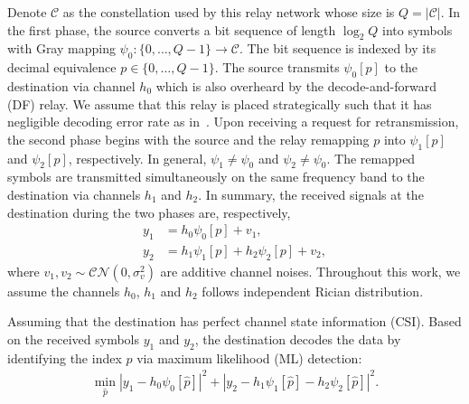\documentclass[journal]{IEEEtran}
\begin{document}
Denote $\mathcal{C}$ as the constellation used by this relay network whose size
is $Q = |\mathcal{C}|$. In the first phase, the source converts a bit sequence
of length $\log_2Q$ into symbols with Gray mapping $\psi_0: \{0,\ldots,Q -
1\}\rightarrow \mathcal{C}$. The bit sequence is indexed by its decimal
equivalence $p\in \{0,\ldots,Q - 1\}$. The source transmits $\psi_0[p]$ to the
destination via channel $h_0$ which is also overheard by the decode-and-forward
(DF) relay. We assume that this relay is placed strategically such that it has
negligible decoding error rate as in~\cite{ryu2011ber, kim2009design}. Upon
receiving a request for retransmission, the second phase begins with
the source and the relay remapping $p$ into $\psi_1[p]$ and $\psi_2[p]$,
respectively.  In general,  $\psi_1\not=\psi_0$ and $\psi_2\not=\psi_0$. The
remapped symbols are transmitted simultaneously on the same frequency band to the
destination via channels $h_1$ and $h_2$. In summary, the received signals at the
destination during the two phases are, respectively, 
\begin{subequations}
    \begin{align}
       y_1 & = h_0\psi_0[p] + v_1, \\
       y_2 & = h_1\psi_1[p] + h_2\psi_2[p] + v_2,
    \end{align}
\end{subequations}
where $v_1, v_2\sim\mathcal{CN}(0,\sigma_v^2)$ are additive channel noises.
Throughout this work, we assume the channels $h_0$, $h_1$ and $h_2$ follows
independent Rician distribution.

Assuming that the destination has perfect channel state information (CSI). Based
on the received symbols $y_1$ and $y_2$,  the destination decodes the data by
identifying the index $p$ via maximum likelihood (ML) detection:
\begin{align}
    \min_{\hat{p}} |y_1 - h_0\psi_0[\hat{p}]|^2 + |y_2-
    h_1\psi_1[\hat{p}] - h_2\psi_2[\hat{p}]|^2.
    \label{eq:ML}
\end{align}

%
%
\end{document}
